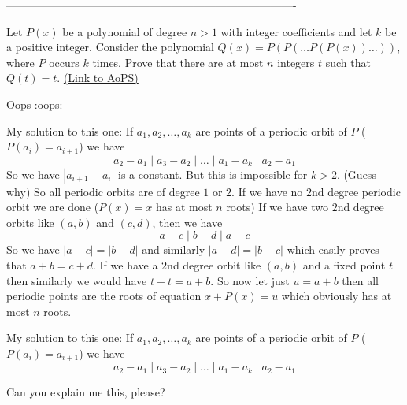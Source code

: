 -------------------------------------------------------------------------------

\begin{problem}
	Let $P(x)$ be a polynomial of degree $n > 1$ with integer coefficients and let $k$ be a positive integer. Consider the polynomial $Q(x) = P(P(\ldots P(P(x)) \ldots ))$, where $P$ occurs $k$ times. Prove that there are at most $n$ integers $t$ such that $Q(t) = t$.
	\flushright \href{https://artofproblemsolving.com/community/c6h101487}{(Link to AoPS)}
\end{problem}



\begin{solution}
	Oops :oops:
\end{solution}



\begin{solution}
	My solution to this one:
If $a_{1}, a_{2},\ldots, a_{k}$ are points of a periodic orbit of $P$ ($P(a_{i})=a_{i+1}$) we have \[a_{2}-a_{1}\mid a_{3}-a_{2}\mid \ldots\mid a_{1}-a_{k}\mid a_{2}-a_{1}\] So we have $|a_{i+1}-a_{i}|$ is a constant. But this is impossible for $k>2$. (Guess why)
So all periodic orbits are of degree $1$ or $2$.
If we have no $2$nd degree periodic orbit we are done ($P(x)=x$ has at most $n$ roots)
If we have two $2$nd degree orbits like $(a,b)$ and $(c,d)$, then we have \[a-c\mid b-d\mid a-c\] So we have $|a-c|=|b-d|$ and similarly $|a-d|=|b-c|$ which easily proves that $a+b=c+d$. If we have a $2$nd degree orbit like $(a,b)$ and a fixed point $t$ then similarly we would have $t+t=a+b$. So now let just $u=a+b$ then all periodic points are the roots of equation $x+P(x)=u$ which obviously has at most $n$ roots.
\end{solution}



\begin{solution}
	\begin{tcolorbox}My solution to this one:
If $a_{1}, a_{2},\ldots, a_{k}$ are points of a periodic orbit of $P$ ($P(a_{i})=a_{i+1}$) we have \[a_{2}-a_{1}\mid a_{3}-a_{2}\mid \ldots\mid a_{1}-a_{k}\mid a_{2}-a_{1}\] \end{tcolorbox}

Can you explain me this, please?
\end{solution}



